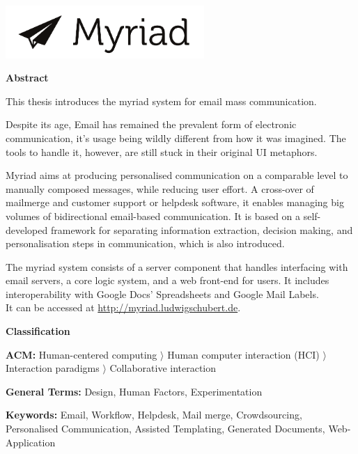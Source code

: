 

\clearemptydoublepage
{}
{}

\begin{center}
  \includegraphics[height=2cm]{figures/myriad-logo.pdf}
\end{center}


\begin{center}
{\Large \bf Abstract}
\end{center}

This thesis introduces the myriad system for email mass communication.

Despite its age, Email has remained the prevalent form of electronic communication, it's usage being wildly different from how it was imagined. The tools to handle it, however, are still stuck in their original UI metaphors.

Myriad aims at producing personalised communication on a comparable level to manually composed messages, while reducing user effort.
A cross-over of mailmerge and customer support or helpdesk software, it enables managing big volumes of bidirectional email-based communication.
It is based on a self-developed framework for separating information extraction, decision making, and personalisation steps in communication, which is also introduced.

The myriad system consists of a server component that handles interfacing with email servers, a core logic system, and a web front-end for users. It includes interoperability with Google Docs' Spreadsheets and Google Mail Labels. \\ It can be accessed at \url{http://myriad.ludwigschubert.de}.

\begin{center}
{\Large \bf Classification}
\end{center}

\textbf{ACM:} Human-centered computing $\rangle$ Human computer interaction (HCI) $\rangle$ Interaction paradigms $\rangle$ Collaborative interaction

\textbf{General Terms:} Design, Human Factors, Experimentation

\textbf{Keywords:} Email, Workflow, Helpdesk, Mail merge, Crowdsourcing, Personalised Communication, Assisted Templating, Generated Documents, Web-Application
